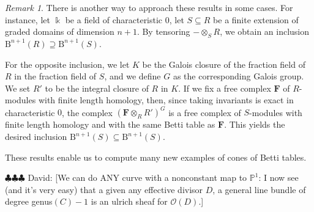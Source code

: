 \documentclass[12pt]{amsart}
\theoremstyle{definition}
\theoremstyle{remark}
\newtheorem{example}[lemma]{Example}
\newtheorem{remark}[lemma]{Remark}
\newcommand{\kk}{\Bbbk}
\newcommand{\PP}{\mathbb{P}}
\newcommand{\cc}{c}
\newcommand{\cO}{\mathcal{O}}
\newcommand{\FF}{\mathbf{F}}
\newcommand{\DD}{\mathrm{D}}
\newcommand{\BBQ}{\mathrm{B}}
\newcommand{\david}[1]{{\color{red} \sf $\clubsuit\clubsuit\clubsuit$ David: [#1]}}
\renewcommand{\P}{{\mathbb P}}
\begin{document}
%
%

\begin{remark}
There is another way to approach these results in some cases.  For instance, let $\kk$ be a field of characteristic $0$, let $S\subseteq R$ be a finite extension of graded domains of dimension $n+1$.  By tensoring $-\otimes_S R$, we obtain an inclusion $\BBQ^{n+1}(R)\supseteq \BBQ^{n+1}(S)$.  

For the opposite inclusion, we let $K$ be the Galois closure of the fraction field of $R$ in the fraction field of $S$, and we define $G$ as the corresponding Galois group.  We set $R'$ to be the integral closure of $R$ in $K$.  If we fix a free complex $\FF$ of $R$-modules with finite length homology, then, since taking invariants is exact in characteristic $0$, the complex $(\FF\otimes_R R')^G$ is a free complex of $S$-modules with finite length homology and with the same Betti table as $\FF$.  This yields the desired inclusion $\BBQ^{n+1}(S)\subseteq \BBQ^{n+1}(S)$.
\end{remark}

These results enable us to compute many new examples of cones of Betti tables.


%

\david{We can do ANY curve with a nonconstant map to $\P^{1}$: I now see (and it's very easy)
that a given any effective divisor $D$, a general line bundle of degree genus$(C)-1$ is an ulrich sheaf for $\cO(D)$.}
 
\end{document}
